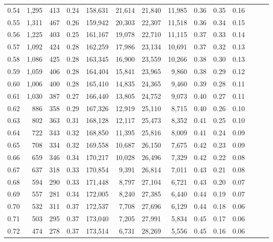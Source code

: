 \begin{tabular}{rrrrrrrrrrrrrr}
0.54 &  1,295 &  413 &  0.24 &  158,631 &   21,614 &  21,840 &  11,985 &  0.36 &  0.35 &      0.16 \\
0.55 &  1,311 &  467 &  0.26 &  159,942 &   20,303 &  22,307 &  11,518 &  0.36 &  0.34 &      0.15 \\
0.56 &  1,225 &  403 &  0.25 &  161,167 &   19,078 &  22,710 &  11,115 &  0.37 &  0.33 &      0.14 \\
0.57 &  1,092 &  424 &  0.28 &  162,259 &   17,986 &  23,134 &  10,691 &  0.37 &  0.32 &      0.13 \\
0.58 &  1,086 &  425 &  0.28 &  163,345 &   16,900 &  23,559 &  10,266 &  0.38 &  0.30 &      0.13 \\
0.59 &  1,059 &  406 &  0.28 &  164,404 &   15,841 &  23,965 &   9,860 &  0.38 &  0.29 &      0.12 \\
0.60 &  1,006 &  400 &  0.28 &  165,410 &   14,835 &  24,365 &   9,460 &  0.39 &  0.28 &      0.11 \\
0.61 &  1,030 &  387 &  0.27 &  166,440 &   13,805 &  24,752 &   9,073 &  0.40 &  0.27 &      0.11 \\
0.62 &    886 &  358 &  0.29 &  167,326 &   12,919 &  25,110 &   8,715 &  0.40 &  0.26 &      0.10 \\
0.63 &    802 &  363 &  0.31 &  168,128 &   12,117 &  25,473 &   8,352 &  0.41 &  0.25 &      0.10 \\
0.64 &    722 &  343 &  0.32 &  168,850 &   11,395 &  25,816 &   8,009 &  0.41 &  0.24 &      0.09 \\
0.65 &    708 &  334 &  0.32 &  169,558 &   10,687 &  26,150 &   7,675 &  0.42 &  0.23 &      0.09 \\
0.66 &    659 &  346 &  0.34 &  170,217 &   10,028 &  26,496 &   7,329 &  0.42 &  0.22 &      0.08 \\
0.67 &    637 &  318 &  0.33 &  170,854 &    9,391 &  26,814 &   7,011 &  0.43 &  0.21 &      0.08 \\
0.68 &    594 &  290 &  0.33 &  171,448 &    8,797 &  27,104 &   6,721 &  0.43 &  0.20 &      0.07 \\
0.69 &    557 &  281 &  0.34 &  172,005 &    8,240 &  27,385 &   6,440 &  0.44 &  0.19 &      0.07 \\
0.70 &    532 &  311 &  0.37 &  172,537 &    7,708 &  27,696 &   6,129 &  0.44 &  0.18 &      0.06 \\
0.71 &    503 &  295 &  0.37 &  173,040 &    7,205 &  27,991 &   5,834 &  0.45 &  0.17 &      0.06 \\
0.72 &    474 &  278 &  0.37 &  173,514 &    6,731 &  28,269 &   5,556 &  0.45 &  0.16 &      0.06 \\

\end{tabular}
